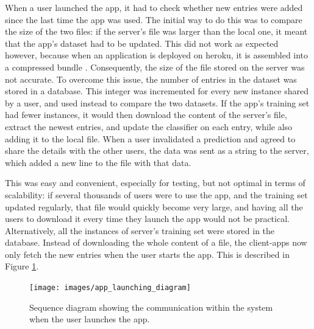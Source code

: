 \documentclass{mproj}
\begin{document}
When a user launched the app, it had to check whether new entries were added since the last time the app was used. The initial way to do this was to compare the size of the two files: if the server's file was larger than the local one, it meant that the app's dataset had to be updated. This did not work as expected however, because when an application is deployed on heroku, it is assembled into a compressed bundle \cite{herokuslug}. Consequently, the size of the file stored on the server was not accurate. To overcome this issue, the number of entries in the dataset was stored in a database. This integer was incremented for every new instance shared by a user, and used instead to compare the two datasets. If the app's training set had fewer instances, it would then download the content of the server's file, extract the newest entries, and update the classifier on each entry, while also adding it to the local file. When a user invalidated a prediction and agreed to share the details with the other users, the data was sent as a string to the server, which added a new line to the file with that data.\par

This was easy and convenient, especially for testing, but not optimal in terms of scalability: if several thousands of users were to use the app, and the training set updated regularly, that file would quickly become very large, and having all the users to download it every time they launch the app would not be practical. Alternatively, all the instances of server's training set were stored in the database. Instead of downloading the whole content of a file, the client-apps now only fetch the new entries when the user starts the app. This is described in Figure \ref{fig:launch}.\par
\begin{figure}[h]
	\centering
	\texttt{[image: images/app\_launching\_diagram]}
	\caption{Sequence diagram showing the communication within the system when the user launches the app.}
	\label{fig:launch}
\end{figure}
\end{document}
